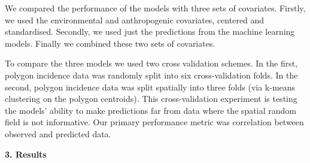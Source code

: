 \documentclass[11pt]{article}
\begin{document}
We compared the performance of the models with three sets of covariates.
Firstly, we used the environmental and anthropogenic covariates, centered and standardised.
Secondly, we used just the predictions from the machine learning models.
Finally we combined these two sets of covariates.

To compare the three models we used two cross validation schemes. 
In the first, polygon incidence data was randomly split into six cross-validation folds.
In the second, polygon incidence data was split spatially into three folds (via k-means clustering on the polygon centroids).
This cross-validation experiment is testing the models’ ability to make predictions far from data where the spatial random field is not informative.
Our primary performance metric was correlation between observed and predicted data.


{\bf 3. Results}
\end{document}
